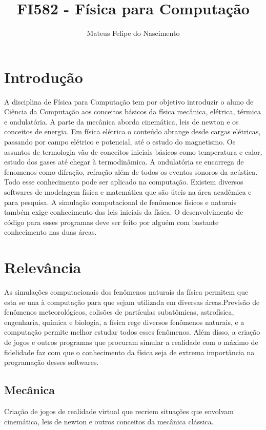 \documentclass[a4paper]{article}
\title{FI582 - Física para Computação}
\author{Mateus Felipe do Nascimento}
\begin{document}
\maketitle

\section{Introdução}

A disciplina de Física para Computação tem por objetivo introduzir o aluno de Ciência da Computação aos conceitos básicos da física mecânica, elétrica, térmica e ondulatória. A parte da mecânica aborda cinemática, leis de newton e os conceitos de energia. Em física elétrica o conteúdo abrange desde cargas elétricas, passando por campo elétrico e potencial, até o estudo do magnetismo. Os assuntos de termologia vão de conceitos iniciais básicos como temperatura e calor, estudo dos gases até chegar à termodinâmica. A ondulatória se encarrega de fenomenos como difração, refração além de todos os eventos sonoros da acústica. Todo esse conhecimento pode ser aplicado na computação. Existem diversos softwares de modelagem física e matemática que são úteis na área acadêmica e para pesquisa. A simulação computacional de fenômenos físicos e naturais também exige conhecimento das leis iniciais da física. O desenvolvimento de código para esses programas deve ser feito por alguém com bastante conhecimento nas duas áreas.   

\section{Relevância}

As simulações computacionais dos fenômenos naturais da física permitem que esta se una à computação para que sejam utilizada em diversas áreas.Previsão de fenômenos meteorológicos, colisões de partículas subatômicas, astrofísica, engenharia, química e biologia, a física rege diversos fenômenos naturais, e a computação permite melhor estudar todos esses fenômenos. Além disso, a criação de jogos e outros programas que procuram simular a realidade com o máximo de fidelidade faz com que o conhecimento da física seja de extrema importância na programação desses softwares. 

\subsection{Mecânica}

Criação de jogos de realidade virtual que recriem situações que envolvam cinemática, leis de newton e outros conceitos da mecânica clássica.
\end{document}
